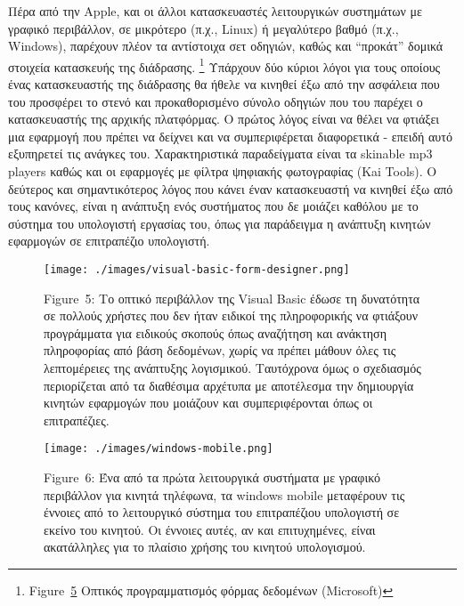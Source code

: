 \documentclass[
]{article}
\begin{document}
Πέρα από την Apple, και οι άλλοι κατασκευαστές λειτουργικών συστημάτων
με γραφικό περιβάλλον, σε μικρότερο (π.χ., Linux) ή μεγαλύτερο βαθμό
(π.χ., Windows), παρέχουν πλέον τα αντίστοιχα σετ οδηγιών, καθώς και
``προκάτ'' δομικά στοιχεία κατασκευής της διάδρασης. \footnote{Figure~\protect\hyperlink{fig:visual-basic-form-designer}{5}
  Οπτικός προγραμματισμός φόρμας δεδομένων (Microsoft)} Υπάρχουν δύο
κύριοι λόγοι για τους οποίους ένας κατασκευαστής της διάδρασης θα ήθελε
να κινηθεί έξω από την ασφάλεια που του προσφέρει το στενό και
προκαθορισμένο σύνολο οδηγιών που του παρέχει ο κατασκευαστής της
αρχικής πλατφόρμας. Ο πρώτος λόγος είναι να θέλει να φτιάξει μια
εφαρμογή που πρέπει να δείχνει και να συμπεριφέρεται διαφορετικά -
επειδή αυτό εξυπηρετεί τις ανάγκες του. Χαρακτηριστικά παραδείγματα
είναι τα skinable mp3 players καθώς και οι εφαρμογές με φίλτρα ψηφιακής
φωτογραφίας (Kai Tools). Ο δεύτερος και σημαντικότερος λόγος που κάνει
έναν κατασκευαστή να κινηθεί έξω από τους κανόνες, είναι η ανάπτυξη ενός
συστήματος που δε μοιάζει καθόλου με το σύστημα του υπολογιστή εργασίας
του, όπως για παράδειγμα η ανάπτυξη κινητών εφαρμογών σε επιτραπέζιο
υπολογιστή.

\leavevmode{}%
\begin{figure}
\hypertarget{fig:visual-basic-form-designer}{%
\centering
\texttt{[image: ./images/visual-basic-form-designer.png]}
\caption{Figure~5: Το οπτικό περιβάλλον της Visual Basic έδωσε τη
δυνατότητα σε πολλούς χρήστες που δεν ήταν ειδικοί της πληροφορικής να
φτιάξουν προγράμματα για ειδικούς σκοπούς όπως αναζήτηση και ανάκτηση
πληροφορίας από βάση δεδομένων, χωρίς να πρέπει μάθουν όλες τις
λεπτομέρειες της ανάπτυξης λογισμικού. Ταυτόχρονα όμως ο σχεδιασμός
περιορίζεται από τα διαθέσιμα αρχέτυπα με αποτέλεσμα την δημιουργία
κινητών εφαρμογών που μοιάζουν και συμπεριφέρονται όπως οι
επιτραπέζιες.}\label{fig:visual-basic-form-designer}
}
\end{figure}

\leavevmode{}%
\begin{figure}
\hypertarget{fig:windows-mobile}{%
\centering
\texttt{[image: ./images/windows-mobile.png]}
\caption{Figure~6: Ένα από τα πρώτα λειτουργικά συστήματα με γραφικό
περιβάλλον για κινητά τηλέφωνα, τα windows mobile μεταφέρουν τις έννοιες
από το λειτουργικό σύστημα του επιτραπέζιου υπολογιστή σε εκείνο του
κινητού. Οι έννοιες αυτές, αν και επιτυχημένες, είναι ακατάλληλες για το
πλαίσιο χρήσης του κινητού υπολογισμού.}\label{fig:windows-mobile}
}
\end{figure}
\end{document}
